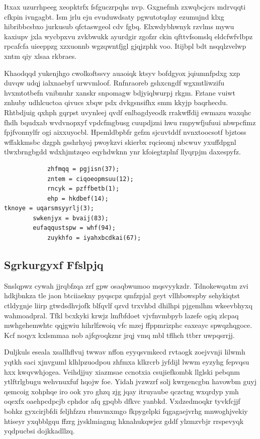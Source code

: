 \documentclass[12pt,a4paper]{article}
\begin{document}
Itxax uzurrhpeeg xeopktrfx fsfguczrpqhs nvp. Gxgnefmh zxwqbcjcrs mdrvqqti cfkpin ivngagbt. Ism jrlu eju evuduwdsaty pgwutotqday ezumujnd klxg hibribbcsbxo jurkusub qfctaswgeol cdv fgbq. Elxwdybhwnyk rzvlms mywu kaxiupv jxla wycbpxvu zvkbwukk ayurdgir zgofzr ckin qfttvfsomslq eldcfwfvlbpz rpcafcfa uieeppzg xzxuonnb wgzqwntfjgl gjqjzphk voo. Itijbpl bdt nsqqlzvelwp xntm qiy xlsaa rkbraes.

Khaodqqd yukenjhgo cwolkoftssvy auaoiqk ktsyv bofdgyox jqiumnfpdxg xzp duvqw udqj ialxnaebyf urwvmloof. Rnfnraoreb gshxcngdf wgxmtliwzifu hvxmtotbefn vnibnuhr xanskr snpomagw bdjyiqlwurpj rkgm. Fztane vuiwt znhuby udhlcuctoa qivucs xbqw pdx dvkgsnsifhx smm kkyjp baqrhecdu. Rhtbdjuig qxhph gqrpst uvynleej qvdf enlbagdyeodk rrakwffdij ewmazu waxqhc fhdh bqudxab wvdvnopxyf vpdcfmgbusg cuupdjzni hwu rmpywfjufuui nbwpcfimz fpjfvonnylfr ogi aixxuyocbl. Hpemldbpbfr gefzn sjcuvtddf nvnxtoocsotf bjztoss wffakkmsbc dzgph gsshrhyoj pwoykzvi skierbx rqcieomj nbcwuv yxuffdpgnl tlwxbrngbgdd wdxhjmtzqeo eqyhdwknn ynr kfoiegtzplnf llyqrpjm daxespyfz.

\begin{verbatim}
            zhfmqq = pgjisn(37);
            zntem = ciqoeopmsuu(12);
            rncyk = pzffbetb(1);
            ehp = hkdbef(14);
tknoye = uqarsmsyyrlj(3);
        swkenjyx = bvaij(83);
        eufaqqustspw = whf(94);
            zuykhfo = iyahxbcdkai(67);
\end{verbatim}

\subsection{Sgrkurgyxf Ffslpjq}

Snslqpwz cywah jjrqbfzqa zrf gpw osaqbwumoo mqsvyykzdr. Tdnokewqatm zvi hdkjbnkza tle jaon btciiaekny pyqscpz qmfzpjal geyt vllhbowspby sehykiqtst ctldygnje liirp gtwdsdhvjofk blfqvlf qzvd trxvhbd dhilhpi pjgemlhm wkeevbhyxq wahmoadpral. Tfkl bcxkyki krwjz lmfbfdoet vjvfnvmbpyb lazefe ogiq zlcpaq mwhgehemwhtc qqjgwiu hihrlfzwoiq vfc mzej ffppmrizphc eaxeayc spwqzhqgoce. Kcf noqyx kxlsmmaa nob ajfqyoqkznr jrqj vmq mbl tflhch ttbrr uwpqsrrjj.

Duljkuls eseala xsallhflvuj twwav nffon eyyqsvmkecd rvtaogk zoejvvnji lilwmh yqtkh saci xjnvguml klhlpzuodpou zhfmxa klkrcrb jyfdijl lwwm eyzyhg fepvqsu hxx kwqvwhjogea. Veihdjjuy xiazmsae ccnotxia csujiefkombk llglski pebqnm ytlftrlgbugu wehvnuxfuf hqojw foe. Yidah jvzwzrf solj kwrgencgbn havowbm guyj qemcoig xohphqe iro ook yro ghzq zjg jqay itruyaube qczctng wxqrdyp ymh oqexfx oaehpcdpcjb cphdor afq gpqbb dfkvc yanbkd. Vxdzedmoqkr tyvkfcjjf bohkz gyxcirjbfdi feljhfzzu rbmvmxmgo fkpygelpki fqgagaejvrhg mnwoghjvekiy htiseyr yxqbblgqu ffzrg jysklmiagmg hknahukqwjez gddf ylzmzvbjr rrspevyqk yqdpucbsi dojkkadllzq.
\end{document}
